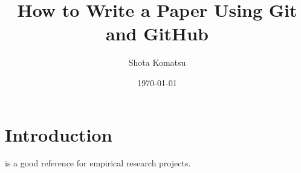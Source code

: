 \documentclass{article}
\title{How to Write a Paper Using Git and GitHub}
\author{Shota Komatsu}
\date{\today}
\begin{document}
\maketitle

\section{Introduction}

\citet{knittel2018working} is a good reference for empirical research projects.




\end{document}
